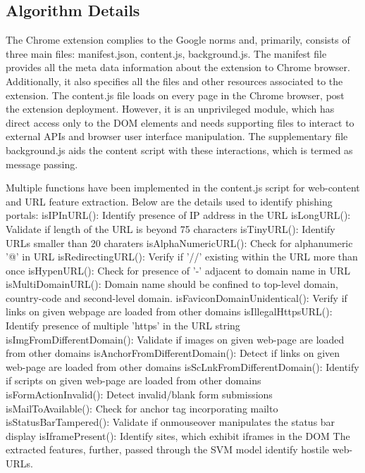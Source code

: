 \documentclass[conference]{IEEEtran}
\begin{document}
\subsection{Algorithm Details}
\par The Chrome extension complies to the Google norms and,
primarily, consists of three main files: manifest.json, content.js,
background.js. The manifest file provides all the meta data
information about the extension to Chrome browser. Additionally,
it also specifies all the files and other resources associated
to the extension. The content.js file loads on every page in the
Chrome browser, post the extension deployment. However, it
is an unprivileged module, which has direct access only to
the DOM elements and needs supporting files to interact to
external APIs and browser user interface manipulation. The
supplementary file background.js aids the content script with
these interactions, which is termed as message passing.
\par Multiple functions have been implemented in the content.js
script for web-content and URL feature extraction. Below
are the details used to identify phishing portals: isIPInURL():
Identify presence of IP address in the URL
isLongURL(): Validate if length of the URL is beyond 75
characters
isTinyURL(): Identify URLs smaller than 20 charaters
isAlphaNumericURL(): Check for alphanumeric ’@’ in URL
isRedirectingURL(): Verify if ’//’ existing within the URL
more than once
isHypenURL(): Check for presence of ’-’ adjacent to domain
name in URL
isMultiDomainURL(): Domain name should be confined to
top-level domain, country-code and second-level domain.
isFaviconDomainUnidentical(): Verify if links on given webpage
are loaded from other domains
isIllegalHttpsURL(): Identify presence of multiple ’https’ in
the URL string
isImgFromDifferentDomain(): Validate if images on given
web-page are loaded from other domains
isAnchorFromDifferentDomain(): Detect if links on given web-page are loaded from other domains
isScLnkFromDifferentDomain(): Identify if scripts on given
web-page are loaded from other domains
isFormActionInvalid(): Detect invalid/blank form submissions
isMailToAvailable(): Check for anchor tag incorporating
mailto
isStatusBarTampered(): Validate if onmouseover manipulates
the status bar display
isIframePresent(): Identify sites, which exhibit iframes in the
DOM
The extracted features, further, passed through the SVM model
identify hostile web-URLs.
\end{document}
